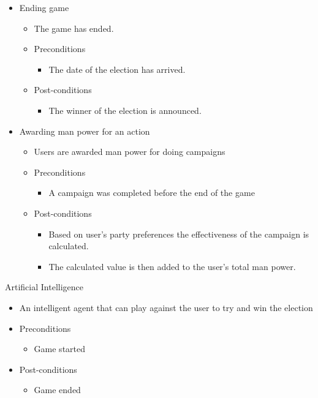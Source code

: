 \documentclass{article}
\begin{document}
	\begin{itemize}
   		\item  Ending game
			\begin{itemize}
				\item The game has ended.
				\item Preconditions
				\begin{itemize}
					\item The date of the election has arrived.
				\end{itemize}
				\item Post-conditions
				\begin{itemize}
					\item The winner of the election is announced.
				\end{itemize}
			\end{itemize}
	\end{itemize}	
	\begin{itemize}
		\item Awarding man power for an action
			\begin{itemize}
				\item Users are awarded man power for doing campaigns 
				\item Preconditions
				\begin{itemize}	
					\item A campaign was completed before the end of the game
				\end{itemize}
				\item Post-conditions
				\begin{itemize}	
					\item Based on user's party preferences the effectiveness of the campaign is calculated.
					\item The calculated value is then added to the user's total man power.
				\end{itemize}
			\end{itemize}
	\end{itemize}
	\item Artificial Intelligence
	\begin{itemize}
			\begin{itemize}
				\item An intelligent agent that can play against the user to try and win the election
				\item Preconditions
				\begin{itemize}
					\item Game started
				\end{itemize}
				\item Post-conditions
				\begin{itemize}
					\item Game ended
				\end{itemize}
			\end{itemize}
	\end{itemize}
\end{document}
